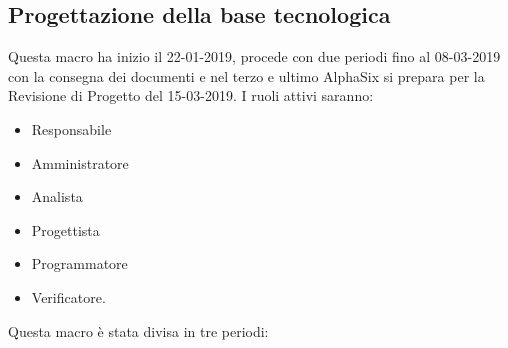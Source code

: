         \subsection{Progettazione della base tecnologica}
        	Questa macro ha inizio il 22-01-2019, procede con due periodi fino al 08-03-2019 con la consegna dei documenti e nel
        terzo e ultimo AlphaSix si prepara per la Revisione di Progetto del 15-03-2019. I ruoli attivi saranno: 
        \begin{itemize}
            \item Responsabile
            \item Amministratore
            \item Analista
            \item Progettista
            \item Programmatore
            \item Verificatore.
        \end{itemize}
        Questa macro è stata divisa in tre periodi:
